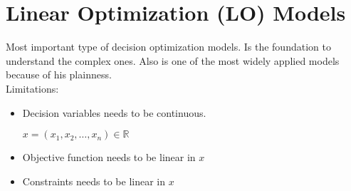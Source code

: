 \section{Linear Optimization (LO) Models}
Most important type of decision optimization models. Is the foundation to understand the complex ones. Also is one of the most widely
applied models because of his plainness.\\

Limitations:
\begin{itemize}
    \item Decision variables needs to be continuous.
    \begin{center}
        $x = (x_1, x_2, \dots , x_n) \in \mathbb{R}$
    \end{center}
    \item Objective function needs to be linear in $x$
    \item Constraints needs to be linear in $x$
\end{itemize}

